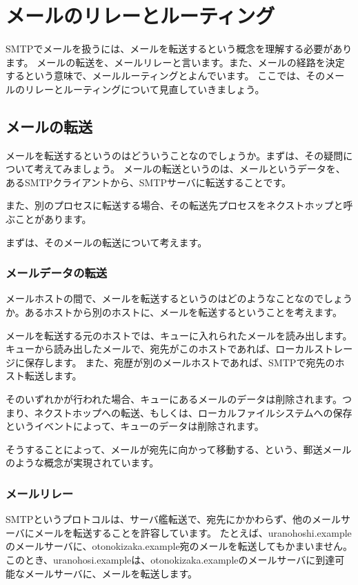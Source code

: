 \chapter{メールのリレーとルーティング}

SMTPでメールを扱うには、メールを転送するという概念を理解する必要があります。
メールの転送を、メールリレーと言います。また、メールの経路を決定するという意味で、メールルーティングとよんでいます。
ここでは、そのメールのリレーとルーティングについて見直していきましょう。


\section{メールの転送}

メールを転送するというのはどういうことなのでしょうか。まずは、その疑問について考えてみましょう。
メールの転送というのは、メールというデータを、あるSMTPクライアントから、SMTPサーバに転送することです。

また、別のプロセスに転送する場合、その転送先プロセスをネクストホップと呼ぶことがあります。

まずは、そのメールの転送について考えます。


\subsection{メールデータの転送}

メールホストの間で、メールを転送するというのはどのようなことなのでしょうか。あるホストから別のホストに、メールを転送するということを考えます。

メールを転送する元のホストでは、キューに入れられたメールを読み出します。キューから読み出したメールで、宛先がこのホストであれば、ローカルストレージに保存します。
また、宛歴が別のメールホストであれば、SMTPで宛先のホスト転送します。

そのいずれかが行われた場合、キューにあるメールのデータは削除されます。つまり、ネクストホップへの転送、もしくは、ローカルファイルシステムへの保存というイベントによって、キューのデータは削除されます。

そうすることによって、メールが宛先に向かって移動する、という、郵送メールのような概念が実現されています。

\subsection{メールリレー}

SMTPというプロトコルは、サーバ艦転送で、宛先にかかわらず、他のメールサーバにメールを転送することを許容しています。
たとえば、uranohoshi.exampleのメールサーバに、otonokizaka.example宛のメールを転送してもかまいません。このとき、uranohosi.exampleは、otonokizaka.exampleのメールサーバに到達可能なメールサーバに、メールを転送します。

